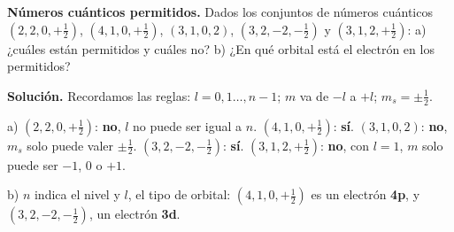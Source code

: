 \begin{example}
    \textbf{Números cuánticos permitidos.} Dados los conjuntos de números cuánticos \((2, 2, 0, +\frac{1}{2})\),
    \((4, 1, 0, +\frac{1}{2})\), \((3, 1, 0, 2)\), \((3, 2, -2, -\frac{1}{2})\) y \((3, 1, 2, +\frac{1}{2})\): a) ¿cuáles están
    permitidos y cuáles no? b) ¿En qué orbital está el electrón en los permitidos?

    \textbf{Solución.} Recordamos las reglas: \(l = 0, 1\dots, n - 1\); \(m\) va de \(-l\) a \(+l\); \(m_s = \pm\frac{1}{2}\).

    a) \((2, 2, 0, +\frac{1}{2})\): \textbf{no}, \(l\) no puede ser igual a \(n\). \((4, 1, 0, +\frac{1}{2})\): \textbf{sí}.
    \((3, 1, 0, 2)\): \textbf{no}, \(m_s\) solo puede valer \(\pm\frac{1}{2}\). \((3, 2, -2, -\frac{1}{2})\): \textbf{sí}.
    \((3, 1, 2, +\frac{1}{2})\): \textbf{no}, con \(l = 1\), \(m\) solo puede ser \(-1\), 0 o \(+1\).

    b) \(n\) indica el nivel y \(l\), el tipo de orbital: \((4, 1, 0, +\frac{1}{2})\) es un electrón \textbf{4p}, y
    \((3, 2, -2, -\frac{1}{2})\), un electrón \textbf{3d}.
\end{example}

